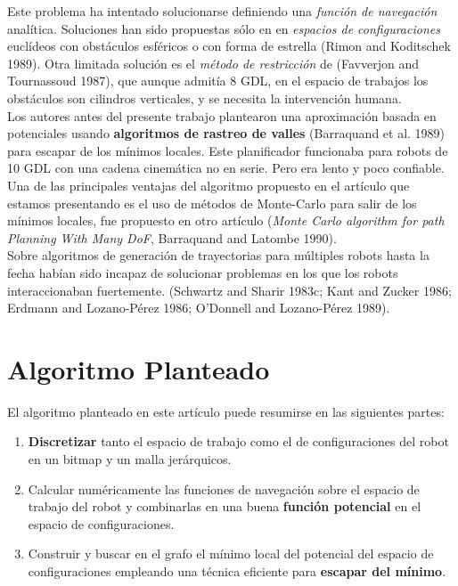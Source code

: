 \documentclass[a4paper, fontsize=11pt]{scrartcl} %
\numberwithin{equation}{section} %
\numberwithin{figure}{section} %
\numberwithin{table}{section} %
\begin{document}
	Este problema ha intentado solucionarse definiendo una \textit{función de navegación} analítica. Soluciones han sido propuestas sólo en en \textit{espacios de configuraciones} euclídeos con obstáculos esféricos o con forma de estrella (Rimon and Koditschek 1989). Otra limitada solución es el \textit{método de restricción} de (Favverjon and Tournassoud 1987), que aunque admitía 8 GDL, en el espacio de trabajos los obstáculos son cilindros verticales, y se necesita la intervención humana.\\
	
	Los autores antes del presente trabajo plantearon una aproximación basada en potenciales usando \textbf{algoritmos de rastreo de valles} (Barraquand et al. 1989) para escapar de los mínimos locales. Este planificador funcionaba para robots de 10 GDL con una cadena cinemática no en serie. Pero era lento y poco confiable.\\
	
	Una de las principales ventajas del algoritmo propuesto en el artículo que estamos presentando es el uso de métodos de Monte-Carlo para salir de los mínimos locales, fue propuesto en otro artículo (\textit{Monte Carlo algorithm for path Planning With Many DoF}, Barraquand and Latombe 1990).\\
		
	Sobre algoritmos de generación de trayectorias para múltiples robots hasta la fecha habían sido incapaz de solucionar problemas en los que los robots interaccionaban fuertemente. (Schwartz and Sharir 1983c; Kant and Zucker 1986; Erdmann and Lozano-Pérez 1986; O'Donnell and Lozano-Pérez 1989).\\
	
	\section{Algoritmo Planteado}
	
	El algoritmo planteado en este artículo puede resumirse en las siguientes partes:
	
	\begin{enumerate}
	\item \textbf{Discretizar} tanto el espacio de trabajo como el de configuraciones del robot en un bitmap y un malla jerárquicos.
	\item Calcular numéricamente las funciones de navegación sobre el espacio de trabajo del robot y combinarlas en una buena \textbf{función potencial} en el espacio de configuraciones.
	\item Construir y buscar en el grafo el mínimo local del potencial del espacio de configuraciones empleando una técnica eficiente para \textbf{escapar del mínimo}.
	\end{enumerate}
	
\end{document}
